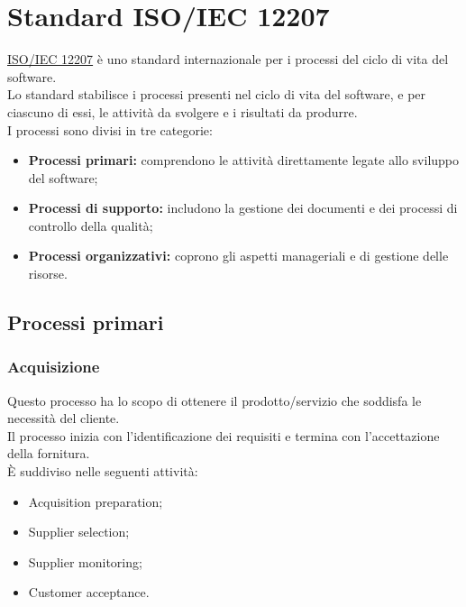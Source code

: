 \appendix

\section{Standard ISO/IEC 12207} \label{section:ISO_IEC_12207}
\href{https://www.math.unipd.it/~tullio/IS-1/2009/Approfondimenti/ISO_12207-1995.pdf}{ISO/IEC 12207} è uno standard internazionale per i processi del ciclo di vita\glo{} del software.\\
Lo standard stabilisce i processi presenti nel ciclo di vita\glo{} del software, e per ciascuno di essi, le attività da svolgere e i risultati da produrre.\\
I processi sono divisi in tre categorie:
\begin{itemize}
  \item \textbf{Processi primari:} comprendono le attività direttamente legate allo sviluppo del software;
  \item \textbf{Processi di supporto:} includono la gestione dei documenti e dei processi di controllo della qualità;
  \item \textbf{Processi organizzativi:} coprono gli aspetti manageriali e di gestione delle risorse.
\end{itemize}

\subsection{Processi primari} \label{subsection:processi_primari}
\subsubsection{Acquisizione}
Questo processo ha lo scopo di ottenere il prodotto/servizio che soddisfa le necessità del cliente.\\
Il processo inizia con l'identificazione dei requisiti e termina con l'accettazione della fornitura.\\
È suddiviso nelle seguenti attività:
\begin{itemize}
  \item Acquisition preparation;
  \item Supplier selection;
  \item Supplier monitoring;
  \item Customer acceptance.
\end{itemize}

